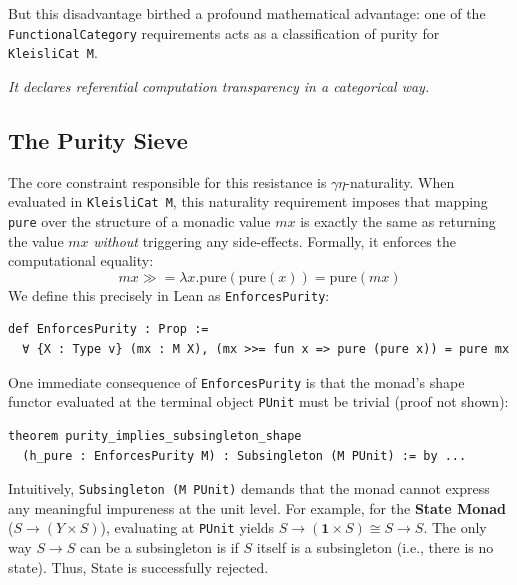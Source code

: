 \documentclass{article}
\begin{document}
But this disadvantage birthed a profound mathematical advantage: one of the
\texttt{FunctionalCategory} requirements acts as a classification of purity for
\texttt{KleisliCat M}. 

\vspace{12pt}

\emph{It declares referential computation transparency in a categorical way.}

\subsection{The Purity Sieve}
The core constraint responsible for this resistance is $\gamma\eta$-naturality. When evaluated in
\texttt{KleisliCat M}, this naturality requirement imposes that mapping \texttt{pure} over the
structure of a monadic value $mx$ is exactly the same as returning the value $mx$ \emph{without}
triggering any side-effects. Formally, it enforces the computational equality:
\[
mx \gg= \lambda x. \text{pure}(\text{pure}(x)) = \text{pure}(mx)
\]
We define this precisely in Lean as \texttt{EnforcesPurity}:

\vspace{6pt}
\begin{lstlisting}[basicstyle=\tiny]
def EnforcesPurity : Prop :=
  ∀ {X : Type v} (mx : M X), (mx >>= fun x => pure (pure x)) = pure mx
\end{lstlisting}
\vspace{6pt}

One immediate consequence of \texttt{EnforcesPurity} is that the monad's shape functor evaluated at
the terminal object \texttt{PUnit} must be trivial (proof not shown):

\vspace{6pt}
\begin{lstlisting}[basicstyle=\tiny]
theorem purity_implies_subsingleton_shape
  (h_pure : EnforcesPurity M) : Subsingleton (M PUnit) := by ...
\end{lstlisting}
\vspace{6pt}

Intuitively, \texttt{Subsingleton (M PUnit)} demands that the monad cannot express any meaningful
impureness at the unit level. For example, for the \textbf{State Monad} ($S \to (Y \times S)$),
evaluating at \texttt{PUnit} yields $S \to (\mathbf{1} \times S) \cong S \to S$. The only way
$S \to S$ can be a subsingleton is if $S$ itself is a subsingleton (i.e., there is no state).
Thus, State is successfully rejected.
\end{document}
